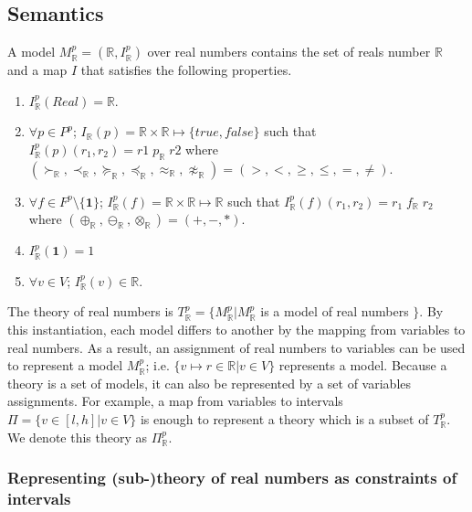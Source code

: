 \subsection{Semantics}
A model $M^p_{\mathbb{R}} = (\mathbb{R}, I^p_{\mathbb{R}})$ over real numbers contains the set of reals number $\mathbb{R}$ and a map $I$ that satisfies the following properties.
\begin{enumerate}
\item $I^p_{\mathbb{R}}(Real) = \mathbb{R}$.
\item $\forall p \in P^p$; $I_{\mathbb{R}}(p) = \mathbb{R} \times \mathbb{R} \mapsto \{true, false\}$ such that $ I_\mathbb{R}^p(p)(r_1, r_2) = r1 \; p_{\mathbb{R}} \; r2$ where $(\succ_\mathbb{R}, \prec_{\mathbb{R}},\succeq_\mathbb{R},\preceq_{\mathbb{R}}, \approx_\mathbb{R}, \not\approx_\mathbb{R}) = (>, <, \ge, \le, =, \neq)$.
\item $\forall f \in F^p \setminus \{\mathbf{1}\}$; $I^p_{\mathbb{R}}(f) = \mathbb{R} \times \mathbb{R} \mapsto \mathbb{R}$ such that $I^p_{\mathbb{R}}(f)(r_1, r_2)  = r_1 \; f_{\mathbb{R}} \; r_2$ where $(\oplus_{\mathbb{R}}, \ominus_{\mathbb{R}}, \otimes_{\mathbb{R}}) = (+, -, *)$.
\item $I^p_\mathbb{R}(\mathbf{1}) = 1$
\item $\forall v \in V$; $I^p_{\mathbb{R}}(v) \in \mathbb{R}$.
\end{enumerate}
The theory of real numbers is $T^p_{\mathbb{R}} = \{M^p_{\mathbb{R}} | M^p_{\mathbb{R}}$ is a model of real numbers $\}$.
By this instantiation, each model differs to another by the mapping from variables to real numbers. As a result, an assignment of real numbers to variables can be used to represent a model $M^p_{\mathbb{R}}$; i.e. $\{v \mapsto r \in \mathbb{R} | v \in V\}$ represents a model. Because a theory is a set of models, it can also be represented by a set of variables assignments. For example, a map from variables to intervals $\Pi = \{v \in [l, h] | v \in V\}$ is enough to represent a theory which is a subset of $T^p_\mathbb{R}$. We denote this theory as $\Pi^p_\mathbb{R}$.

\subsubsection*{Representing (sub-)theory of real numbers as constraints of intervals}

